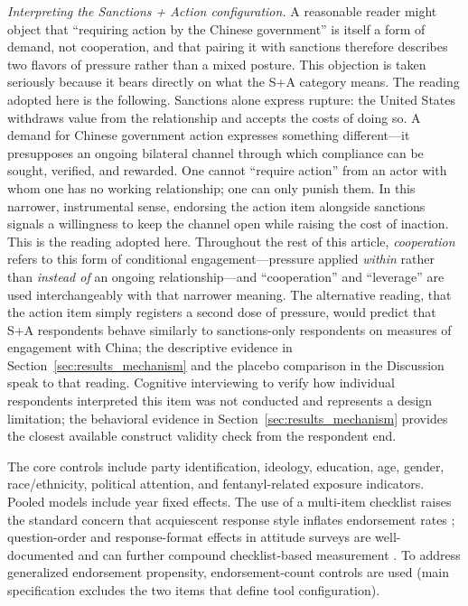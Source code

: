 \documentclass[12pt,letterpaper]{article}
\begin{document}
\textit{Interpreting the Sanctions + Action configuration.} A reasonable reader might object that ``requiring action by the Chinese government'' is itself a form of demand, not cooperation, and that pairing it with sanctions therefore describes two flavors of pressure rather than a mixed posture. This objection is taken seriously because it bears directly on what the S+A category means. The reading adopted here is the following. Sanctions alone express rupture: the United States withdraws value from the relationship and accepts the costs of doing so. A demand for Chinese government action expresses something different---it presupposes an ongoing bilateral channel through which compliance can be sought, verified, and rewarded. One cannot ``require action'' from an actor with whom one has no working relationship; one can only punish them. In this narrower, instrumental sense, endorsing the action item alongside sanctions signals a willingness to keep the channel open while raising the cost of inaction. This is the reading adopted here. Throughout the rest of this article, \emph{cooperation} refers to this form of conditional engagement---pressure applied \emph{within} rather than \emph{instead of} an ongoing relationship---and ``cooperation'' and ``leverage'' are used interchangeably with that narrower meaning. The alternative reading, that the action item simply registers a second dose of pressure, would predict that S+A respondents behave similarly to sanctions-only respondents on measures of engagement with China; the descriptive evidence in Section~\ref{sec:results_mechanism} and the placebo comparison in the Discussion speak to that reading. Cognitive interviewing to verify how individual respondents interpreted this item was not conducted and represents a design limitation; the behavioral evidence in Section~\ref{sec:results_mechanism} provides the closest available construct validity check from the respondent end.

The core controls include party identification, ideology, education, age, gender, race/ethnicity, political attention, and fentanyl-related exposure indicators. Pooled models include year fixed effects. The use of a multi-item checklist raises the standard concern that acquiescent response style inflates endorsement rates \citep{bishop_illusion_2005}; question-order and response-format effects in attitude surveys are well-documented and can further compound checklist-based measurement \citep{schuman_questions_1981}. To address generalized endorsement propensity, endorsement-count controls are used (main specification excludes the two items that define tool configuration).
\end{document}
